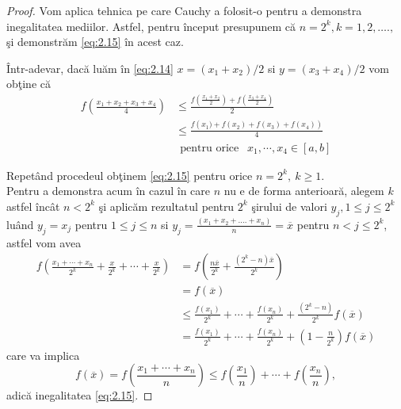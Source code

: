 \documentclass[a4paper,12pt,oneside]{report}
\begin{document}
\begin{proof}
Vom aplica tehnica pe care Cauchy a folosit-o pentru a demonstra inegalitatea mediilor. Astfel, pentru \^{i}nceput presupunem c\u{a} \(n = 2^{k}, k=1,2,….,\) \c{s}i demonstr\u{a}m \ref{eq:2.15} \^{i}n acest caz.

\^{I}ntr-adevar, dac\u{a} lu\u{a}m \^{i}n \ref{eq:2.14} $x=(x_1+x_2)/2$ si $y=(x_3+x_4)/2$ vom ob\c{t}ine c\u{a}
\begin{equation} \nonumber
\begin{split}
   f\left ( \frac{x_1 + x_2+x_3+x_4}{4} \right ) &    \leq \frac{f\left ( \frac{x_1 + x_2}{2} \right) + f\left(\frac{x_3 + x_4}{2} \right )}{2} \\ &   \leq \frac{f\left (x_1) + f\left (x_2 \right )+f\left (x_3 \right )+f\left (x_4 \right ) \right)}{4} \\ &   ~~ \text{pentru orice } ~~ x_1, \cdots, x_4 \in \left [ a, b \right ]
\end{split}
\end{equation}

Repet\^{a}nd procedeul ob\c{t}inem \ref{eq:2.15} pentru orice $n=2^k,~k\geq 1.$\\
 Pentru a demonstra acum \^{i}n cazul \^{i}n care $n$ nu e de forma anterioar\u{a}, alegem  \(k\) astfel \^{i}nc\^{a}t \(n< 2^{k}\) \c{s}i aplic\u{a}m rezultatul pentru \(2^{k}\) \c{s}irului de valori \(y_{j} , 1\leq j\leq 2^{k}\) lu\^{a}nd \(y_{j} = x_{j}\) pentru \(1\leq j\leq n \) si \(y_{j} = \frac{\left ( x_{1} + x_{2} + ....+ x_{n} \right )}{n}=\overline{x}\) pentru \(n< j\leq 2^{k}\), astfel vom avea
 \begin{equation} \nonumber
     \begin{split}
         f\left ( \frac{x_1 + \cdots+x_n}{2^k}+\frac{x}{2^k}+\cdots+\frac{x}{2^k} \right ) &  =f\left( \frac{n \overline{x}}{2^k}+\frac{(2^k-n) \overline{x}}{2^k}\right) \\ &  =f(\overline{x}) \\ & \leq \frac{ f(x_1)}{2^k}+\cdots+\frac{ f(x_n)}{2^k}+\frac{(2^k-n)}{2^k}f(\overline{x}) \\ & =\frac{ f(x_1)}{2^k}+\cdots+\frac{ f(x_n)}{2^k}+ (1-\frac{n}{2^k})f(\overline{x})
     \end{split}
 \end{equation}
care va implica
 \[
 f(\overline{x})=  f\left ( \frac{x_1 + \cdots+x_n}{n} \right )\leq f\left ( \frac{x_1}{n} \right )+\cdots+f\left ( \frac{x_n}{n} \right ),
 \]
 adic\u{a} inegalitatea \ref{eq:2.15}.
\end{proof}
\end{document}
